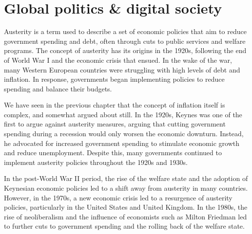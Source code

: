 \section{Global politics \& digital society}
Austerity is a term used to describe a set of economic policies that aim to reduce government spending and debt, often through cuts to public services and welfare programs. The concept of austerity has its origins in the 1920s, following the end of World War I and the economic crisis that ensued. In the wake of the war, many Western European countries were struggling with high levels of debt and inflation. In response, governments began implementing policies to reduce spending and balance their budgets.\par
We have seen in the previous chapter that the concept of inflation itself is complex, and somewhat argued about still. In the 1920s, Keynes was one of the first to argue against austerity measures, arguing that cutting government spending during a recession would only worsen the economic downturn. Instead, he advocated for increased government spending to stimulate economic growth and reduce unemployment. Despite this, many governments continued to implement austerity policies throughout the 1920s and 1930s.\par
In the post-World War II period, the rise of the welfare state and the adoption of Keynesian economic policies led to a shift away from austerity in many countries. However, in the 1970s, a new economic crisis led to a resurgence of austerity policies, particularly in the United States and United Kingdom. In the 1980s, the rise of neoliberalism and the influence of economists such as Milton Friedman led to further cuts to government spending and the rolling back of the welfare state.\par 
